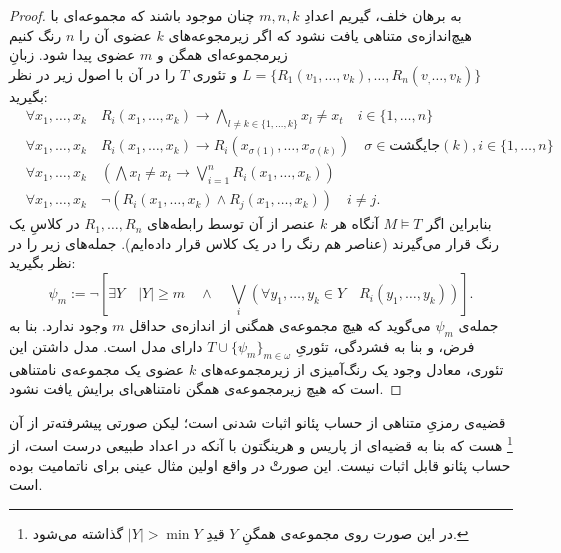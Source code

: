 \documentclass[12pt,a4paper]{report}
\theoremstyle{colorhead}
\begin{document}
\begin{proof}
به برهان خلف، گیریم اعدادِ
$m,n,k$
چنان موجود باشند که مجموعه‌ای با هیچ‌اندازه‌ی متناهی یافت نشود که اگر زیرمجوعه‌های
$k$
عضوی آن را 
$n$
رنگ کنیم زیرمجموعه‌ای
همگن و 
$m$
عضوی پیدا شود. زبانِ
$L=\{R_1(v_1,\ldots,v_k),\ldots,R_n(v_,\ldots,v_k)\}$
و تئوری
$T$
را در آن با اصول زیر در نظر بگیرید:
\begin{align*}
&\forall x_1,\ldots,x_k\quad  R_i(x_1,\ldots,x_k)\to \bigwedge_{l\not=k\in \{1,\ldots,k\}} x_l\not=x_t\quad i\in \{1,\ldots,n\}
\\
&
\forall x_1,\ldots,x_k\quad  
R_i(x_1,\ldots,x_k)\to R_i(x_{\sigma(1)},\ldots,x_{\sigma(k)})\quad \sigma\in \textbf{جایگشت}(k),
i\in \{1,\ldots,n\}
\\
&
\forall x_1,\ldots,x_k \quad \left(\bigwedge x_l\not=x_t\to \bigvee_{i=1}^n R_i(x_1,\ldots,x_k)\right)\\
&
\forall x_1,\ldots,x_k  \quad \neg \left(R_i(x_1,\ldots,x_k)\wedge R_j(x_1,\ldots,x_k)\right)\quad  i\neq j.
\end{align*}
بنابراین اگر
$M\models T$
آنگاه هر 
$k$
عنصر از آن  توسط رابطه‌های
$R_1,\ldots,R_n$
در کلاسِ یک رنگ قرار می‌گیرند (عناصر هم رنگ را در یک کلاس قرار داده‌ایم).  جمله‌های زیر را در نظر بگیرید:
\[
\psi_m:= \neg \left[\exists Y\quad |Y|\geq m\quad \wedge \quad 
\bigvee_i
\left(\forall y_1,\ldots,y_k\in Y \quad R_i(y_1,\ldots,y_k)\right)\right]. 
\]
جمله‌ی
$\psi_m$
می‌گوید که هیچ مجموعه‌ی همگنی از اندازه‌ی حداقل
$m$
وجود ندارد. 
بنا به فرض، و بنا به فشردگی، 
تئوریِ
$T\cup \{\psi_m\}_{m\in \omega}$
دارای مدل است. مدل داشتن این تئوری، معادل وجود یک رنگ‌آمیزی از زیرمجموعه‌های
$k$
عضوی یک مجموعه‌ی نامتناهی است که هیچ زیرمجموعه‌ی همگن نامتناهی‌ای برایش یافت نشود.
\end{proof}
قضیه‌ی رمزیِ متناهی از حساب پئانو اثبات شدنی است؛ 
لیکن 
صورتی پیشرفته‌تر از آن
\footnote{در این صورت روی مجموعه‌ی همگنِ
$Y$
قیدِ
$|Y|>\min Y$
گذاشته می‌شود.
}
 هست که
بنا به قضیه‌ای از
پاریس و هرینگتون
با آنکه در
اعداد طبیعی درست است،‌
از حساب
پئانو قابل اثبات نیست. این صورتْ در واقع اولین مثال عینی برای ناتمامیت بوده است. 
\newpage 
\end{document}
